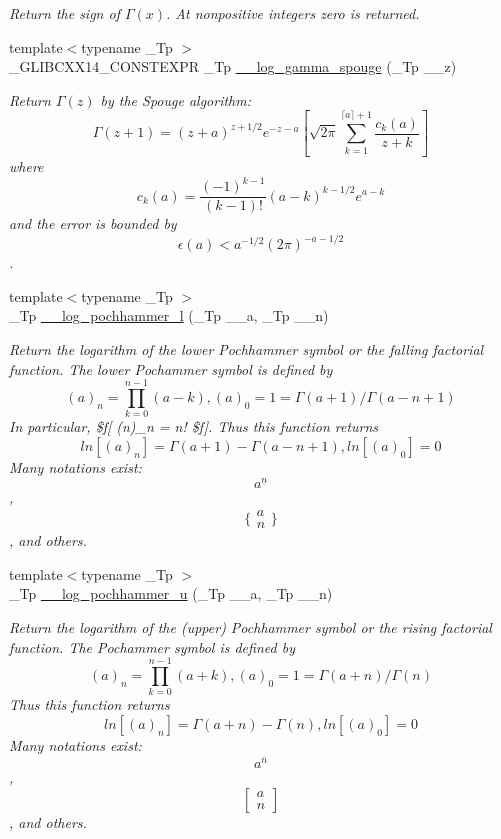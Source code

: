 \begin{DoxyCompactItemize}
\begin{DoxyCompactList}\small\item\em Return the sign of $ \Gamma(x) $. At nonpositive integers zero is returned. \end{DoxyCompactList}\item 
{\footnotesize template$<$typename \+\_\+\+Tp $>$ }\\\+\_\+\+G\+L\+I\+B\+C\+X\+X14\+\_\+\+C\+O\+N\+S\+T\+E\+X\+P\+R \+\_\+\+Tp \hyperlink{namespacestd_1_1____detail_adf0ab4fe086fff067e7c9e11104562b1}{\+\_\+\+\_\+log\+\_\+gamma\+\_\+spouge} (\+\_\+\+Tp \+\_\+\+\_\+z)
\begin{DoxyCompactList}\small\item\em Return $\Gamma(z)$ by the Spouge algorithm\+: \[ \Gamma(z+1) = (z+a)^{z+1/2}e^{-z-a}\left[ \sqrt{2\pi} \sum_{k=1}^{\lceil a \rceil + 1}\frac{c_k(a)}{z+k}\right] \] where \[ c_k(a) = \frac{(-1)^{k-1}}{(k-1)!}(a-k)^{k-1/2}e^{a-k} \] and the error is bounded by \[ \epsilon(a) < a^{-1/2}(2\pi)^{-a-1/2} \]. \end{DoxyCompactList}\item 
{\footnotesize template$<$typename \+\_\+\+Tp $>$ }\\\+\_\+\+Tp \hyperlink{namespacestd_1_1____detail_a287ee67c3a3214ed32d161bede80fbf4}{\+\_\+\+\_\+log\+\_\+pochhammer\+\_\+l} (\+\_\+\+Tp \+\_\+\+\_\+a, \+\_\+\+Tp \+\_\+\+\_\+n)
\begin{DoxyCompactList}\small\item\em Return the logarithm of the lower Pochhammer symbol or the falling factorial function. The lower Pochammer symbol is defined by \[ (a)_n = \prod_{k=0}^{n-1} (a - k), (a)_0 = 1 = \Gamma(a + 1) / \Gamma(a - n + 1) \] In particular, \$f\mbox{[} (n)\+\_\+n = n! \$f\mbox{]}. Thus this function returns \[ ln[(a)_n] = \Gamma(a + 1) - \Gamma(a - n + 1), ln[(a)_0] = 0 \] Many notations exist\+: \[ a^{\underline{n}} \], \[ \{ \begin{array}{c} a \\ n \end{array} \} \], and others. \end{DoxyCompactList}\item 
{\footnotesize template$<$typename \+\_\+\+Tp $>$ }\\\+\_\+\+Tp \hyperlink{namespacestd_1_1____detail_a562403a92b80066d306b054eb319460b}{\+\_\+\+\_\+log\+\_\+pochhammer\+\_\+u} (\+\_\+\+Tp \+\_\+\+\_\+a, \+\_\+\+Tp \+\_\+\+\_\+n)
\begin{DoxyCompactList}\small\item\em Return the logarithm of the (upper) Pochhammer symbol or the rising factorial function. The Pochammer symbol is defined by \[ (a)_n = \prod_{k=0}^{n-1} (a + k), (a)_0 = 1 = \Gamma(a + n) / \Gamma(n) \] Thus this function returns \[ ln[(a)_n] = \Gamma(a + n) - \Gamma(n), ln[(a)_0] = 0 \] Many notations exist\+: \[ a^{\overline{n}} \], \[ \left[ \begin{array}{c} a \\ n \end{array} \right] \], and others. \end{DoxyCompactList}\item 

\end{DoxyCompactItemize}
